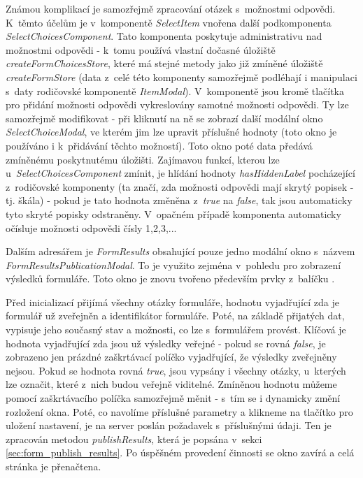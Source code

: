 			Známou komplikací je samozřejmě zpracování otázek s~možnostmi odpovědi. K~těmto účelům je v~komponentě \textit{SelectItem} vnořena další podkomponenta \textit{SelectChoicesComponent}. Tato komponenta poskytuje administrativu nad možnostmi odpovědi - k~tomu používá vlastní dočasné úložiště \textit{createFormChoicesStore}, které má stejné metody jako již zmíněné úložiště \textit{createFormStore} (data z~celé této komponenty samozřejmě podléhají i manipulaci s~daty rodičovské komponentě \textit{ItemModal}). V~komponentě jsou kromě tlačítka pro přidání možnosti odpovědi vykreslovány samotné možnosti odpovědi. Ty lze samozřejmě modifikovat - při kliknutí na ně se zobrazí další modální okno \textit{SelectChoiceModal}, ve kterém jim lze upravit příslušné hodnoty (toto okno je používáno i k~přidávání těchto možností). Toto okno poté data předává zmíněnému poskytnutému úložišti. Zajímavou funkcí, kterou lze u~\textit{SelectChoicesComponent} zmínit, je hlídání hodnoty \textit{hasHiddenLabel} pocházející z~rodičovské komponenty (ta značí, zda možnosti odpovědi mají skrytý popisek - tj. škála) - pokud je tato hodnota změněna z~\textit{true} na \textit{false}, tak jsou automaticky tyto skryté popisky odstraněny. V~opačném případě komponenta automaticky očísluje možnosti odpovědi čísly 1,2,3,...
			
			\label{sec:modalni_okna_vysledky_form}
			Dalším adresářem je \textit{FormResults} obsahující pouze jedno modální okno s~názvem \textit{FormResultsPublicationModal}. To je využito zejména v~pohledu pro zobrazení výsledků formuláře. Toto okno je znovu tvořeno především prvky z~balíčku . 
			
			Před inicializací přijímá všechny otázky formuláře, hodnotu vyjadřující zda je formulář už zveřejněn a identifikátor formuláře. Poté, na základě přijatých dat, vypisuje jeho současný stav a možnosti, co lze s~formulářem provést. Klíčová je hodnota vyjadřující zda jsou už výsledky veřejné - pokud se rovná \textit{false}, je zobrazeno jen prázdné zaškrtávací políčko vyjadřující, že výsledky zveřejněny nejsou. Pokud se hodnota rovná \textit{true}, jsou vypsány i všechny otázky, u~kterých lze označit, které z~nich budou veřejně viditelné. Zmíněnou hodnotu můžeme pomocí zaškrtávacího políčka samozřejmě měnit - s~tím se i dynamicky změní rozložení okna. Poté, co navolíme příslušné parametry a klikneme na tlačítko pro uložení nastavení, je na server poslán požadavek s~příslušnými údaji. Ten je zpracován metodou \textit{publishResults}, která je popsána v~sekci \ref{sec:form_publish_results}. Po úspěšném provedení činnosti se okno zavírá a celá stránka je přenačtena.
			
